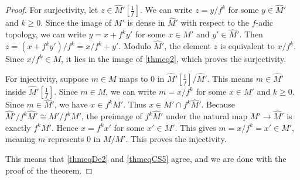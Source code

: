 \documentclass[11pt]{amsart}
\renewcommand{\hat}{\widehat} %
\theoremstyle{plain}
\theoremstyle{definition}
\numberwithin{equation}{prop}
\begin{document}
\begin{proof}
For surjectivity, let $z \in \hat M'[\frac{1}{f}]$. We can write $z = y/f^k$ for some $y \in \hat M'$ and $k \ge 0$.
Since the image of $M'$ is dense in $\hat M'$ with respect to the $f$-adic topology, we can write $y = x + f^k y'$ for some $x \in M'$ and $y' \in \hat M'$.
Then $z = (x + f^k y')/f^k = x/f^k + y'$.
Modulo $\hat M'$, the element $z$ is equivalent to $x/f^k$. Since $x/f^k \in M$, it lies in the image of \eqref{thmeq2}, which proves the surjectivity.

For injectivity, suppose $m \in M$ maps to $0$ in $\hat M'[\frac{1}{f}] / \hat M'$.
This means $m \in \hat M'$ inside $\hat M'[\frac{1}{f}]$.
Since $m \in M$, we can write $m = x/f^k$ for some $x \in M'$ and $k \ge 0$.
Since $m \in \hat M'$, we have $x \in f^k \hat M'$.
Thus $x \in M' \cap f^k \hat M'$.
Because $\hat M'/f^k \hat M' \cong M'/f^k M'$, the preimage of $f^k \hat M'$ under the natural map $M' \to \hat M'$ is exactly $f^k M'$.
Hence $x = f^k x'$ for some $x' \in M'$.
This gives $m = x/f^k = x' \in M'$, meaning $m$ represents $0$ in $M/M'$. This proves the injectivity.

This means that \eqref{thmeqDe2} and \eqref{thmeqCS5} agree, and we are done with the proof of the theorem.

\end{proof}





\end{document}
